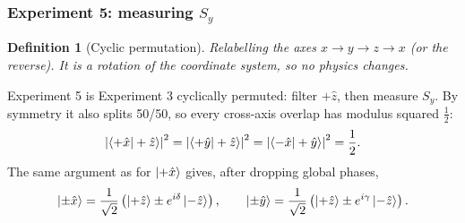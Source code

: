 \documentclass{article}
\newtheorem{definition}{Definition}
\begin{document}
\subsubsection{Experiment 5: measuring \texorpdfstring{$S_y$}{Sy}}
\begin{definition}[Cyclic permutation]
    Relabelling the axes $x \to y \to z \to x$ (or the reverse). It is a rotation of the coordinate system, so no physics changes.
\end{definition}
Experiment 5 is Experiment 3 cyclically permuted: filter $+\hat{z}$, then measure $S_y$. By symmetry it also splits 50/50, so every cross-axis overlap has modulus squared $\tfrac12$:
\[\left|\braket{+\hat{x}|+\hat{z}}\right|^2 = \left|\braket{+\hat{y}|+\hat{z}}\right|^2 = \left|\braket{-\hat{x}|+\hat{y}}\right|^2 = \frac{1}{2}.\]
The same argument as for $\ket{+\hat{x}}$ gives, after dropping global phases,
\[\ket{\pm\hat{x}} = \frac{1}{\sqrt{2}}\left(\ket{+\hat{z}} \pm e^{i\delta}\ket{-\hat{z}}\right), \qquad \ket{\pm\hat{y}} = \frac{1}{\sqrt{2}}\left(\ket{+\hat{z}} \pm e^{i\gamma}\ket{-\hat{z}}\right).\]
\end{document}
